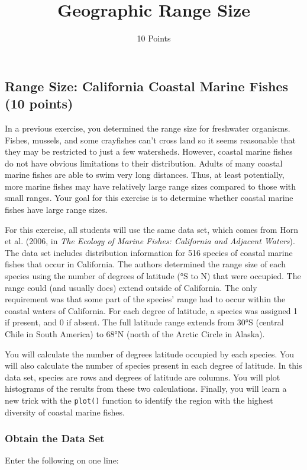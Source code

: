 \documentclass[11pt]{article}
\title{Geographic Range Size}
\author{10 Points}
\date{}                                           %
\begin{document}
	\thispagestyle{first_page}

\subsection*{Range Size: California Coastal Marine Fishes (10 points)}

In a previous exercise, you determined the range size for freshwater
organisms. Fishes, mussels, and some crayfishes can't cross land so it seems
reasonable that they may be restricted to just a few watersheds.
However, coastal marine fishes do not have obvious limitations to their
distribution. Adults of many coastal marine fishes are able to swim very
long distances. Thus, at least potentially, more marine fishes may have
relatively large range sizes compared to those with small ranges. Your
goal for this exercise is to determine whether coastal marine fishes
have large range sizes.

For this exercise, all students will use the same data set, which comes
from Horn et al. (2006, in \emph{The Ecology of Marine Fishes:
California and Adjacent Waters}). The data set includes distribution
information for 516 species of coastal marine fishes that occur in
California. The authors determined the range size of each species using
the number of degrees of latitude (°S to N) that were occupied. The
range could (and usually does) extend outside of California. The only
requirement was that some part of the species' range had to occur within
the coastal waters of California. For each degree of latitude, a species
was assigned 1 if present, and 0 if absent. The full latitude range
extends from 30°S (central Chile in South America) to 68°N (north of the
Arctic Circle in Alaska).

You will calculate the number of degrees latitude occupied by each
species. You will also calculate the number of species present in each
degree of latitude. In this data set, species are rows and degrees of
latitude are columns. You will plot histograms of the results from these
two calculations. Finally, you will learn a new trick with the
\texttt{plot()} function to identify the region with the highest
diversity of coastal marine fishes.

\subsubsection*{Obtain the Data Set}

Enter the following on one line:
\end{document}
